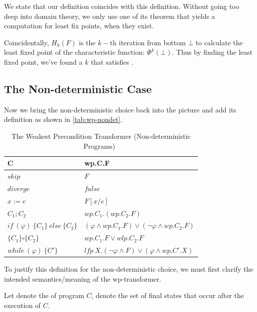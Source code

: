 We state that our definition coincides with this definition. 
Without going too deep into domain theory, we only use one of its theorem that yields a computation for least fix points, when they exist. 

\begin{theorem}
\end{theorem}


Coincidentally, $H_k(F)$ is the $k-$th iteration from bottom $\bot$ to calculate the least fixed point of the characteristic function: $\Phi^k(\bot)$. 
Thus by finding the least fixed point, we've found a $k$ that satisfies . 




\subsection{The Non-deterministic Case}\label{sec:wp-nondet}
Now we bring the non-deterministic choice back into the picture and add its definition as shown in \autoref{tab:wp-nondet}. 

\begin{table}[ht!]\centering
    \begin{tabular}{ll}
    \hline\hline
      \textbf{C}&\textbf{wp.C.F}    \\ \hline
      $skip$&   $F$   \\
      $diverge$&  $false$\\
      $x:= e $&  $F[x/e]$\\
      $C_1;C_2$&  $wp.C_1.(wp.C_2.F)$\\
      $if\ (\varphi)\ \{C_1\}\ else\ \{C_2\} $&  $(\varphi\wedge wp.C_1.F)\vee(\neg\varphi\wedge wp.C_2.F)$\\
      {\color{Maroon}$\{C_1\}\square \{C_2\}$} & {\color{Maroon}$wp.C_1.F\vee wlp.C_2.F$}\\
      $while\ (\varphi)\ \{C'\}$&  $lfp\ X.(\neg\varphi\wedge F)\vee(\varphi\wedge wp.C'.X)$\\
    \hline\hline
    \end{tabular}
    \caption{The Weakest Precondition Transformer (Non-deterministic Programs)~\cite{kaminski19}}
    \label{tab:wp-nondet}
\end{table}

To justify this definition for the non-deterministic choice, we must first clarify the intended semantics/meaning of the wp-transformer. 

Let  denote the  of program $C$,  denote the set of final states that  occur after the execution of $C$. 

